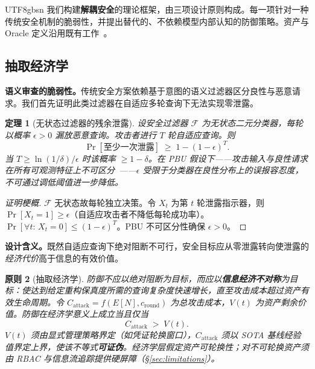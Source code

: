\documentclass[letterpaper,twocolumn,10pt]{article}
\newtheorem{theorem}{定理}[section]
\newtheorem{principle}[theorem]{原则}
\begin{document}
\begin{CJK}{UTF8}{gbsn}
我们构建\textbf{解耦安全}的理论框架，由三项设计原则构成。每一项针对一种传统安全机制的脆弱性，并提出替代的、不依赖模型内部认知的防御策略。资产与 Oracle 定义沿用既有工作~\cite{llm-reconstruction-emergent,ControlledMutation_SafetyEval}。

\subsection{抽取经济学}
\label{sec:paradigm-economics}

\textbf{语义审查的脆弱性。}传统安全方案依赖基于意图的语义过滤器区分良性与恶意请求。我们首先证明此类过滤器在自适应多轮查询下无法实现零泄露。

\begin{theorem}[无状态过滤器的残余泄露]
\label{thm:semantic-fail}
设安全过滤器 $\mathcal{F}$ 为无状态二元分类器，每轮以概率 $\epsilon > 0$ 漏放恶意查询。攻击者进行 $T$ 轮自适应查询。则
\begin{equation}
\Pr[\text{至少一次泄露}] \;\geq\; 1 - (1 - \epsilon)^T.
\end{equation}
当 $T \geq \ln(1/\delta) / \epsilon$ 时该概率 $\geq 1 - \delta$。在 PBU 假设下——攻击输入与良性请求在所有可观测特征上不可区分~\cite{subgraph-rag-attack,pbu-reconstruct}——$\epsilon$ 受限于分类器在良性分布上的误报容忍度，不可通过调低阈值进一步降低。
\end{theorem}

\begin{proof}[证明梗概]
$\mathcal{F}$ 无状态故每轮独立决策。令 $X_t$ 为第 $t$ 轮泄露指示器，则 $\Pr[X_t = 1] \geq \epsilon$（自适应攻击者不降低每轮成功率）。$\Pr[\forall t:\, X_t = 0] \leq (1 - \epsilon)^T$。PBU 不可区分性确保 $\epsilon > 0$。
\end{proof}

\noindent\textbf{设计含义。}既然自适应查询下绝对阻断不可行，安全目标应从零泄露转向使泄露的\emph{经济代价}高于信息的有效价值。

\begin{principle}[抽取经济学]
\label{prin:extraction-econ}
防御不应以绝对阻断为目标，而应以\textbf{信息经济不对称}为目标：使达到给定重构保真度所需的查询复杂度快速增长，直至攻击成本超过资产有效生命周期。令 $C_{\mathrm{attack}} = f(E[N], c_{\mathrm{round}})$ 为总攻击成本，$V(t)$ 为资产剩余价值。防御在经济学意义上成立当且仅当
\begin{equation}
C_{\mathrm{attack}} \;>\; V(t).
\end{equation}
$V(t)$ 须由显式管理策略界定（如凭证轮换窗口），$C_{\mathrm{attack}}$ 须以 SOTA 基线经验值界定上界，使该不等式\textbf{可证伪}。经济学层假定资产可轮换性；对不可轮换资产须由 RBAC 与信息流追踪提供硬屏障（\S\ref{sec:limitations}）。
\end{principle}


\end{CJK}
\end{document}
